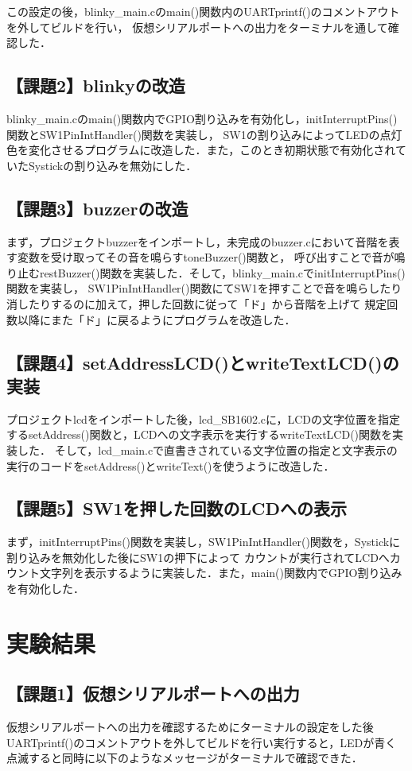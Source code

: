 \documentclass{jlreq}
\begin{document}
この設定の後，blinky\_main.cのmain()関数内のUARTprintf()のコメントアウトを外してビルドを行い，
仮想シリアルポートへの出力をターミナルを通して確認した．

\subsection{【課題2】blinkyの改造}
blinky\_main.cのmain()関数内でGPIO割り込みを有効化し，initInterruptPins()関数とSW1PinIntHandler()関数を実装し，
SW1の割り込みによってLEDの点灯色を変化させるプログラムに改造した．また，このとき初期状態で有効化されていたSystickの割り込みを無効にした．

\subsection{【課題3】buzzerの改造}
まず，プロジェクトbuzzerをインポートし，未完成のbuzzer.cにおいて音階を表す変数を受け取ってその音を鳴らすtoneBuzzer()関数と，
呼び出すことで音が鳴り止むrestBuzzer()関数を実装した．そして，blinky\_main.cでinitInterruptPins()関数を実装し，
SW1PinIntHandler()関数にてSW1を押すことで音を鳴らしたり消したりするのに加えて，押した回数に従って「ド」から音階を上げて
規定回数以降にまた「ド」に戻るようにプログラムを改造した．

\subsection{【課題4】setAddressLCD()とwriteTextLCD()の実装}
プロジェクトlcdをインポートした後，lcd\_SB1602.cに，LCDの文字位置を指定するsetAddress()関数と，LCDへの文字表示を実行するwriteTextLCD()関数を実装した．
そして，lcd\_main.cで直書きされている文字位置の指定と文字表示の実行のコードをsetAddress()とwriteText()を使うように改造した．

\subsection{【課題5】SW1を押した回数のLCDへの表示}
まず，initInterruptPins()関数を実装し，SW1PinIntHandler()関数を，Systickに割り込みを無効化した後にSW1の押下によって
カウントが実行されてLCDへカウント文字列を表示するように実装した．また，main()関数内でGPIO割り込みを有効化した．

\section{実験結果}

\subsection{【課題1】仮想シリアルポートへの出力}
仮想シリアルポートへの出力を確認するためにターミナルの設定をした後UARTprintf()のコメントアウトを外してビルドを行い実行すると，LEDが青く点滅すると同時に以下のようなメッセージがターミナルで確認できた．
\end{document}
